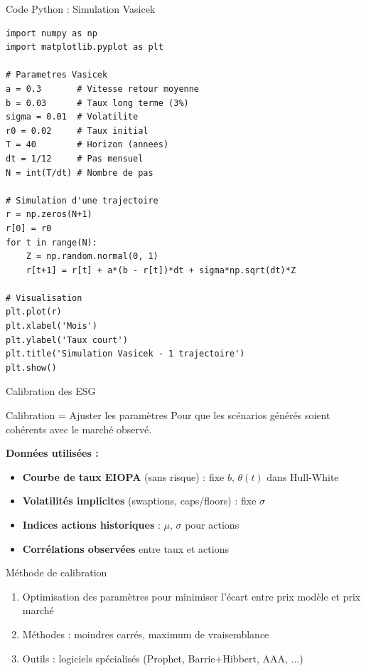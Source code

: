 \documentclass[10pt,aspectratio=169,xcolor={dvipsnames}]{beamer}
\begin{document}
\begin{frame}[fragile]{Code Python : Simulation Vasicek}
\begin{lstlisting}[style=pythonstyle]
import numpy as np
import matplotlib.pyplot as plt

# Parametres Vasicek
a = 0.3       # Vitesse retour moyenne
b = 0.03      # Taux long terme (3%)
sigma = 0.01  # Volatilite
r0 = 0.02     # Taux initial
T = 40        # Horizon (annees)
dt = 1/12     # Pas mensuel
N = int(T/dt) # Nombre de pas

# Simulation d'une trajectoire
r = np.zeros(N+1)
r[0] = r0
for t in range(N):
    Z = np.random.normal(0, 1)
    r[t+1] = r[t] + a*(b - r[t])*dt + sigma*np.sqrt(dt)*Z

# Visualisation
plt.plot(r)
plt.xlabel('Mois')
plt.ylabel('Taux court')
plt.title('Simulation Vasicek - 1 trajectoire')
plt.show()
\end{lstlisting}
\end{frame}

\begin{frame}{Calibration des ESG}
\begin{block}{Calibration = Ajuster les paramètres}
Pour que les scénarios générés soient cohérents avec le marché observé.
\end{block}

\textbf{Données utilisées :}
\begin{itemize}
    \item \textbf{Courbe de taux EIOPA} (sans risque) : fixe $b$, $\theta(t)$ dans Hull-White
    \item \textbf{Volatilités implicites} (swaptions, caps/floors) : fixe $\sigma$
    \item \textbf{Indices actions historiques} : $\mu$, $\sigma$ pour actions
    \item \textbf{Corrélations observées} entre taux et actions
\end{itemize}

\vspace{0.3cm}
\begin{exampleblock}{Méthode de calibration}
\begin{enumerate}
    \item Optimisation des paramètres pour minimiser l'écart entre prix modèle et prix marché
    \item Méthodes : moindres carrés, maximum de vraisemblance
    \item Outils : logiciels spécialisés (Prophet, Barrie+Hibbert, AAA, ...)
\end{enumerate}
\end{exampleblock}
\end{frame}
\end{document}
